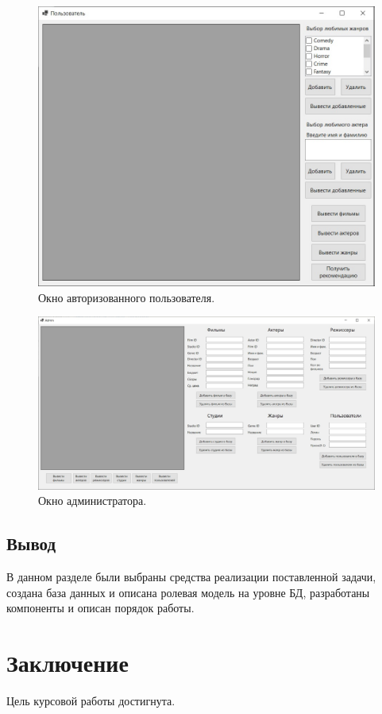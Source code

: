 \begin{figure}[h!]
	\centering
	\includegraphics[scale=0.90]{img/user.jpg}
	\caption{Окно авторизованного пользователя.}
	\label{img:user}
\end{figure}
\clearpage
\begin{figure}[h!]
	\centering
	\includegraphics[scale=0.50]{img/admin.jpg}
	\caption{Окно администратора.}
	\label{img:admin}
\end{figure}

\subsection{Вывод}
В данном разделе были выбраны средства реализации поставленной задачи, создана база данных и описана ролевая модель на уровне БД, разработаны компоненты и описан порядок работы.
\newpage
\section*{Заключение}
Цель курсовой работы достигнута.

